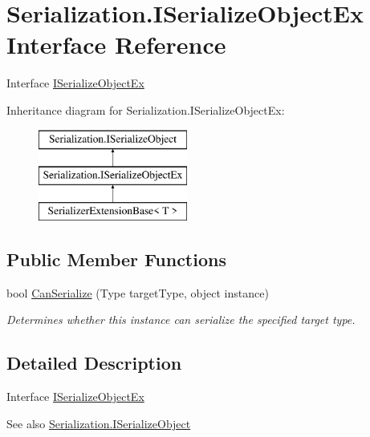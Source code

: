 \hypertarget{interface_serialization_1_1_i_serialize_object_ex}{}\section{Serialization.\+I\+Serialize\+Object\+Ex Interface Reference}
\label{interface_serialization_1_1_i_serialize_object_ex}


Interface \hyperlink{interface_serialization_1_1_i_serialize_object_ex}{I\+Serialize\+Object\+Ex}  


Inheritance diagram for Serialization.\+I\+Serialize\+Object\+Ex\+:\begin{figure}[H]
\begin{center}
\leavevmode
\includegraphics[height=3.000000cm]{interface_serialization_1_1_i_serialize_object_ex}
\end{center}
\end{figure}
\subsection*{Public Member Functions}
\begin{DoxyCompactItemize}
\item 
bool \hyperlink{interface_serialization_1_1_i_serialize_object_ex_a5a13bf50bde25dc6b1f593da8cb5eb06}{Can\+Serialize} (Type target\+Type, object instance)
\begin{DoxyCompactList}\small\item\em Determines whether this instance can serialize the specified target type. \end{DoxyCompactList}\end{DoxyCompactItemize}


\subsection{Detailed Description}
Interface \hyperlink{interface_serialization_1_1_i_serialize_object_ex}{I\+Serialize\+Object\+Ex} 

\begin{DoxySeeAlso}{See also}
\hyperlink{interface_serialization_1_1_i_serialize_object}{Serialization.\+I\+Serialize\+Object}


\end{DoxySeeAlso}


